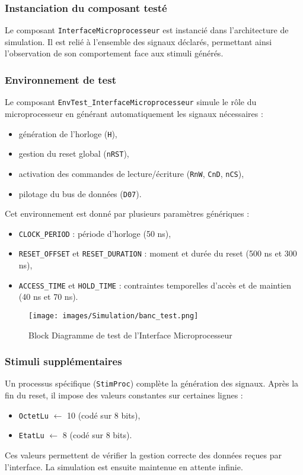 \subsubsection{Instanciation du composant testé}
Le composant \texttt{InterfaceMicroprocesseur} est instancié dans l’architecture de simulation.  
Il est relié à l’ensemble des signaux déclarés, permettant ainsi l’observation de son comportement face aux stimuli générés.

\subsubsection{Environnement de test}
Le composant \texttt{EnvTest\_InterfaceMicroprocesseur} simule le rôle du microprocesseur en générant automatiquement les signaux nécessaires :
\begin{itemize}
  \item génération de l’horloge (\texttt{H}),
  \item gestion du reset global (\texttt{nRST}),
  \item activation des commandes de lecture/écriture (\texttt{RnW}, \texttt{CnD}, \texttt{nCS}),
  \item pilotage du bus de données (\texttt{D07}).
\end{itemize}

Cet environnement est donné par plusieurs paramètres génériques :
\begin{itemize}
  \item \texttt{CLOCK\_PERIOD} : période d’horloge (50 ns),
  \item \texttt{RESET\_OFFSET} et \texttt{RESET\_DURATION} : moment et durée du reset (500 ns et 300 ns),
  \item \texttt{ACCESS\_TIME} et \texttt{HOLD\_TIME} : contraintes temporelles d’accès et de maintien (40 ns et 70 ns).
\end{itemize}

\begin{figure}[H]
    \centering
    \texttt{[image: images/Simulation/banc\_test.png]}
    \caption{Block Diagramme de test de l’Interface Microprocesseur}
    \label{fig:placeholder}
\end{figure}

\subsubsection{Stimuli supplémentaires}
Un processus spécifique (\texttt{StimProc}) complète la génération des signaux.  
Après la fin du reset, il impose des valeurs constantes sur certaines lignes :
\begin{itemize}
  \item \texttt{OctetLu} $\leftarrow$ 10 (codé sur 8 bits),
  \item \texttt{EtatLu} $\leftarrow$ 8 (codé sur 8 bits).
\end{itemize}
Ces valeurs permettent de vérifier la gestion correcte des données reçues par l’interface.  
La simulation est ensuite maintenue en attente infinie.

